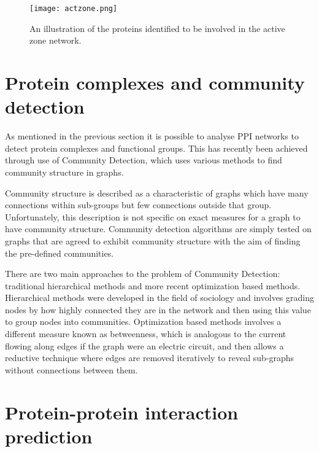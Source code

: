 \begin{figure}
    \centering
    \texttt{[image: actzone.png]}
    \caption{An illustration of the proteins identified to be involved in the active zone network\autocite{chua_architecture_2010}.}
    \label{fig:actzone}
\end{figure}


\section{Protein complexes and community detection}

As mentioned in the previous section it is possible to analyse PPI networks to detect protein complexes and functional groups.
This has recently been achieved through use of Community Detection\autocites{chen_identifying_2013,wang_recent_2010}, which uses various methods to find community structure in graphs.

Community structure is described as a characteristic of graphs which have many connections within sub-groups but few connections outside that group\autocite{newman_communities_2012}.
Unfortunately, this description is not specific on exact measures for a graph to have community structure.
Community detection algorithms are simply tested on graphs that are agreed to exhibit community structure with the aim of finding the pre-defined communities.

There are two main approaches to the problem of Community Detection: traditional hierarchical methods and more recent optimization based methods\autocite{newman_communities_2012}.
Hierarchical methods were developed in the field of sociology and involves grading nodes by how highly connected they are in the network and then using this value to group nodes into communities.
Optimization based methods involves a different measure known as betweenness, which is analogous to the current flowing along edges if the graph were an electric circuit, and then allows a reductive technique where edges are removed iteratively to reveal sub-graphs without connections between them.



\section{Protein-protein interaction prediction}

